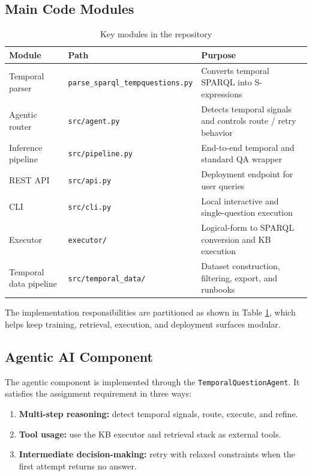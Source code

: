 \documentclass[a4paper,11pt]{article}
\begin{document}
\subsection{Main Code Modules}

\begin{table}[H]
\centering
\caption{Key modules in the repository}
\label{tab:modules}
\footnotesize
\setlength{\tabcolsep}{3pt}
\begin{tabularx}{\textwidth}{>{\raggedright\arraybackslash}p{3.0cm}>{\raggedright\arraybackslash}p{5.4cm}>{\raggedright\arraybackslash}X}
\toprule
\textbf{Module} & \textbf{Path} & \textbf{Purpose} \\
\midrule
Temporal parser & \texttt{parse\_sparql\_tempquestions.py} & Converts temporal SPARQL into S-expressions \\
Agentic router & \texttt{src/agent.py} & Detects temporal signals and controls route / retry behavior \\
Inference pipeline & \texttt{src/pipeline.py} & End-to-end temporal and standard QA wrapper \\
REST API & \texttt{src/api.py} & Deployment endpoint for user queries \\
CLI & \texttt{src/cli.py} & Local interactive and single-question execution \\
Executor & \texttt{executor/} & Logical-form to SPARQL conversion and KB execution \\
Temporal data pipeline & \texttt{src/temporal\_data/} & Dataset construction, filtering, export, and runbooks \\
\bottomrule
\end{tabularx}
\end{table}

The implementation responsibilities are partitioned as shown in Table \ref{tab:modules}, which helps keep training, retrieval, execution, and deployment surfaces modular.

\subsection{Agentic AI Component}

The agentic component is implemented through the \texttt{TemporalQuestionAgent}. It satisfies the assignment requirement in three ways:

\begin{enumerate}[leftmargin=1.4cm]
  \item \textbf{Multi-step reasoning:} detect temporal signals, route, execute, and refine.
  \item \textbf{Tool usage:} use the KB executor and retrieval stack as external tools.
  \item \textbf{Intermediate decision-making:} retry with relaxed constraints when the first attempt returns no answer.
\end{enumerate}
\end{document}
